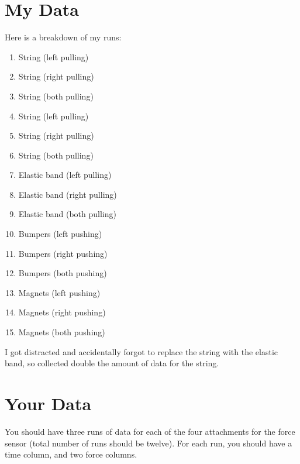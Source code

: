 \section{My Data}
%
Here is a breakdown of my runs:
\begin{enumerate}
    \item String (left pulling)
    \item String (right pulling)
    \item String (both pulling)
    \item String (left pulling)
    \item String (right pulling)
    \item String (both pulling)
    \item Elastic band (left pulling)
    \item Elastic band (right pulling)
    \item Elastic band (both pulling)
    \item Bumpers (left pushing)
    \item Bumpers (right pushing)
    \item Bumpers (both pushing)
    \item Magnets (left pushing)
    \item Magnets (right pushing)
    \item Magnets (both pushing)
\end{enumerate}
I got distracted and accidentally forgot to replace the string with the elastic band, so collected double the amount of data for the string.
%
\section{Your Data}
%
You should have three runs of data for each of the four attachments for the force sensor (total number of runs should be twelve). For each run, you should have a time column, and two force columns. 
%
\newpage
